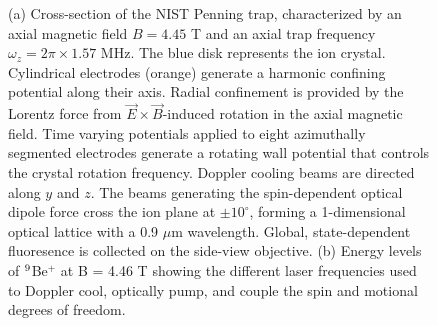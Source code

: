 \documentclass[aps,prl,twocolumn,superscriptaddress,floatfix]{revtex4-1}
\begin{document}
\begin{figure}[h]
  \hfill
  \hfill
  \caption{(a) Cross-section of the NIST Penning trap, characterized by an axial magnetic field $B = 4.45$ T and an axial trap frequency $\omega_z = 2\pi \times 1.57$ MHz. The blue disk represents the ion crystal. Cylindrical electrodes (orange) generate a harmonic confining potential along their axis. Radial confinement is provided by the Lorentz force from $\vec{E} \times \vec{B}$-induced rotation in the axial magnetic field. Time varying potentials applied to eight azimuthally segmented electrodes generate a rotating wall potential that controls the crystal rotation frequency. Doppler cooling beams are directed along $y$ and $z$. The beams generating the spin-dependent optical dipole force cross the ion plane at $\pm 10^{\circ}$, forming a 1-dimensional optical lattice with a 0.9 $\mu$m wavelength. Global, state-dependent fluoresence is collected on the side-view objective. (b) Energy levels of $\prescript{9}{}{}$Be$^{+}$ at B = 4.46 T showing the different laser frequencies used to Doppler cool, optically pump, and couple the spin and motional degrees of freedom.}\label{Fig 1}
\end{figure}
\fi
\end{document}
